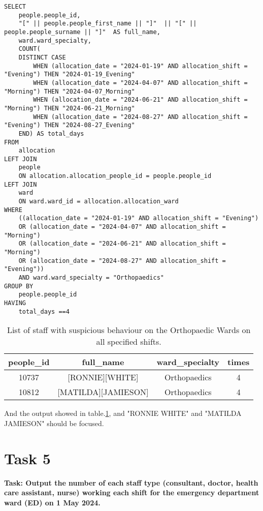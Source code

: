 \documentclass{article}
\begin{document}
\begin{lstlisting}[style=sqlstyle]
SELECT 
    people.people_id,
    "[" || people.people_first_name || "]"  || "[" || people.people_surname || "]"  AS full_name,
    ward.ward_specialty,
    COUNT(
    DISTINCT CASE
        WHEN (allocation_date = "2024-01-19" AND allocation_shift = "Evening") THEN "2024-01-19_Evening"
        WHEN (allocation_date = "2024-04-07" AND allocation_shift = "Morning") THEN "2024-04-07_Morning"
        WHEN (allocation_date = "2024-06-21" AND allocation_shift = "Morning") THEN "2024-06-21_Morning"
        WHEN (allocation_date = "2024-08-27" AND allocation_shift = "Evening") THEN "2024-08-27_Evening"
    END) AS total_days
FROM
    allocation
LEFT JOIN
    people
    ON allocation.allocation_people_id = people.people_id
LEFT JOIN
    ward
    ON ward.ward_id = allocation.allocation_ward
WHERE 
    ((allocation_date = "2024-01-19" AND allocation_shift = "Evening") 
    OR (allocation_date = "2024-04-07" AND allocation_shift = "Morning")
    OR (allocation_date = "2024-06-21" AND allocation_shift = "Morning")
    OR (allocation_date = "2024-08-27" AND allocation_shift = "Evening")) 
    AND ward.ward_specialty = "Orthopaedics"
GROUP BY
    people.people_id
HAVING
    total_days ==4

\end{lstlisting}

\begin{table}[h]
    \centering
\begin{tabular}{|c|c|c|c|}
\hline people\_id & full\_name & ward\_specialty & times \\
\hline 10737 & [RONNIE][WHITE] & Orthopaedics & 4 \\
\hline 10812 & [MATILDA][JAMIESON] & Orthopaedics & 4 \\
\hline
\end{tabular}
    \caption{List of staff with suspicious behaviour on the Orthopaedic Wards on all specified shifts.}
    \label{tab:task4}
\end{table}

And the output showed in table.\ref{tab:task4}, and "RONNIE WHITE" and "MATILDA JAMIESON" should be focused.


\section{Task 5}

\textbf{Task: Output the number of each staff type (consultant, doctor, health care assistant, nurse) working each shift for the emergency department ward (ED) on 1 May 2024.}
\end{document}
